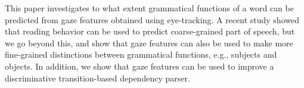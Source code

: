 This paper investigates to what extent grammatical functions of a word can be predicted from gaze features obtained using eye-tracking. A recent study showed that reading behavior can be used to predict coarse-grained part of speech, but we go beyond this, and show that gaze features can also be used to make more fine-grained distinctions between grammatical functions, e.g., subjects and objects. In addition, we show that gaze features can be used to improve a discriminative transition-based dependency parser.
